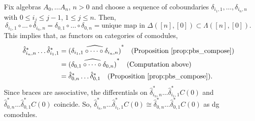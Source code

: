 \begin{eg} 
\label{eg:pb3}
Fix algebras $A_0, \dots A_n$, $n>0$ 
and choose a sequence of coboundaries 
$\delta_{i_1,1}, \dots, \delta_{i_n,n}$ with 
$0 \leq i_j \leq j-1$, $1 \leq j \leq n$. 
Then,
$$
\delta_{i_1,1} \circ \dots \circ \delta_{i_n,n} 
= \delta_{0,1} \circ \dots \circ \delta_{0,n}
= \textrm{unique map in } \Delta([n],[0])
  \subset \Lambda([n],[0]).
$$
This implies that, as functors 
on categories of comodules, 
\begin{align*}
\hat{\delta}_{i_n,n}^* \dots \hat{\delta}_{i_1,1}^*
&=
\widehat{(\delta_{i_1,1} \circ \dots \circ 
  \delta_{i_n,n})}^*
  \quad \textrm{(Proposition \ref{prop:pbs_compose})}\\
&= 
\widehat{(\delta_{0,1} \circ \dots \circ 
  \delta_{0,n})}^*
  \quad \textrm{(Computation above)}\\
&= 
\hat{\delta}_{0,n}^* \dots \hat{\delta}_{0,1}^* 
  \quad \textrm{(Proposition \ref{prop:pbs_compose}).} 
\end{align*}
Since braces are associative, the 
differentials on $\hat{\delta}_{i_n,n}^* 
\dots \hat{\delta}_{i_1,1}^*C(0)$ and 
$\hat{\delta}_{0,n}^* 
\dots \hat{\delta}_{0,1}^*C(0)$ 
coincide. So, $\hat{\delta}_{i_n,n}^* 
\dots \hat{\delta}_{i_1,1}^*C(0)
\cong \hat{\delta}_{0,n}^* 
\dots \hat{\delta}_{0,1}^*C(0)$ 
as dg comodules.
\end{eg}
%
